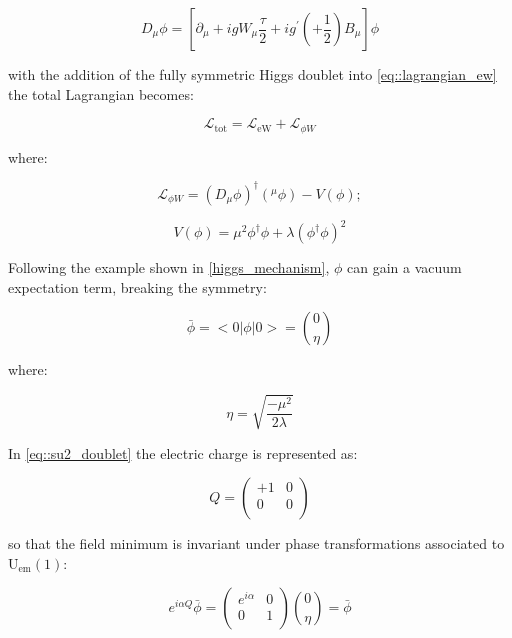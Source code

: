 \begin{equation}
D_{\mu}\phi = [\partial_{\mu} + igW_{\mu} \dfrac{\tau}{2}  + ig^{\prime}(+\dfrac{1}{2})B_{\mu}]\phi 
\end{equation}


with the addition of the fully symmetric Higgs doublet into \autoref{eq::lagrangian_ew} the total Lagrangian becomes:

\begin{equation}
\mathcal{L}_{\text{tot}} = \mathcal{L}_{\text{eW}} + \mathcal{L}_{\phi W}
\end{equation}

where:

\begin{equation}
\mathcal{L}_{\phi W} = (D_{\mu}\phi)^{\dagger} (^{\mu}\phi) - V (\phi);
\label{eq::lagrangian_phiW}
\end{equation}

\begin{equation}
V(\phi) = \mu^{2}\phi^{\dagger}\phi + \lambda(\phi^{\dagger}\phi)^{2}
\end{equation}

Following the example shown in \autoref{higgs_mechanism}, $\phi$ can gain a vacuum expectation term, breaking the symmetry:

\begin{equation}
 \bar{\phi}= < 0|\phi|0 > = \binom{0}{\eta}
 \label{eq::vacuum_expectation}
\end{equation}

where:

\begin{equation}
\eta = \sqrt{\dfrac{-\mu^{2}}{2\lambda}}
\label{eq::eta_value}
\end{equation}

In \autoref{eq::su2_doublet} the electric charge is represented as:

\begin{equation}
Q = 
\begin{pmatrix}
+1 & 0 \\
0 & 0 \\
\end{pmatrix}
\end{equation}

so that the field minimum is invariant under phase transformations associated to $\text{U}_{\text{em}}(1)$:

\begin{equation}
e^{i\alpha Q} \bar{\phi} = 
\begin{pmatrix}
e^{i\alpha} & 0 \\
0 & 1 \\ 
\end{pmatrix}
\binom{0}{\eta}
= \bar{\phi}
\end{equation}

